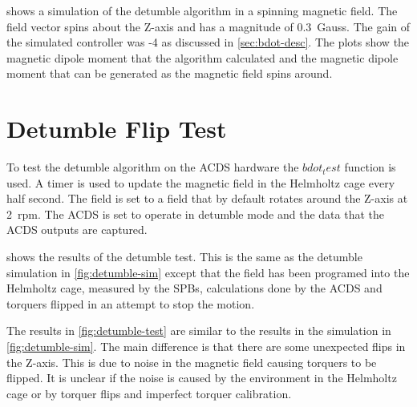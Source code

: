 
 shows a simulation of the detumble algorithm in a spinning magnetic field. The field vector spins about the Z-axis and has a magnitude of 0.3~Gauss. The gain of the simulated controller was -4 as discussed in \cref{sec:bdot-desc}. The plots show the magnetic dipole moment that the algorithm calculated and the magnetic dipole moment that can be generated as the magnetic field spins around.


\section{Detumble Flip Test}

To test the detumble algorithm on the \ac{ACDS} hardware the \lstMat$bdot_test$ function is used. A timer is used to update the magnetic field in the Helmholtz cage every half second. The field is set to a field that by default rotates around the Z-axis at 2~rpm. The \ac{ACDS} is set to operate in detumble mode and the data that the \ac{ACDS} outputs are captured.


 shows the results of the detumble test. This is the same as the detumble simulation in \cref{fig:detumble-sim} except that the field has been programed into the Helmholtz cage, measured by the \acp{SPB}, calculations done by the \ac{ACDS} and torquers flipped in an attempt to stop the motion.

The results in \cref{fig:detumble-test} are similar to the results in the simulation in \cref{fig:detumble-sim}. The main difference is that there are some unexpected flips in the Z-axis. This is due to noise in the magnetic field causing torquers to be flipped. It is unclear if the noise is caused by the environment in the Helmholtz cage or by torquer flips and imperfect torquer calibration.


